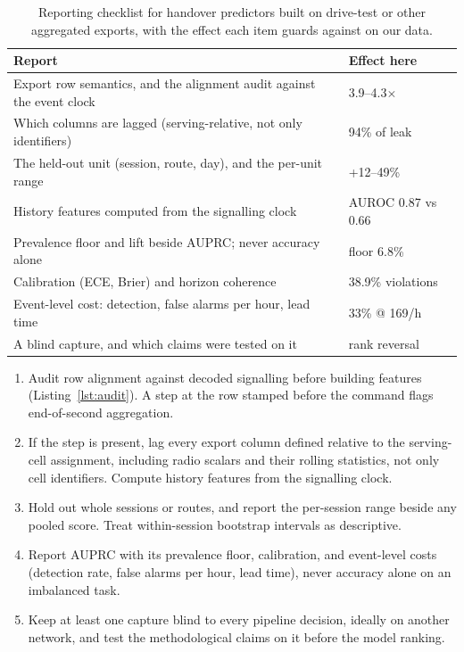 \documentclass[5p,times,twocolumn]{elsarticle}
\newcommand{\x}{$\times$}
\begin{document}
\begin{table}[t]
\centering
\caption{Reporting checklist for handover predictors built on drive-test or other aggregated exports, with the effect each item guards against on our data.}
\label{tab:checklist}
\footnotesize
\begin{tabularx}{\linewidth}{X l}
\toprule
\textbf{Report} & \textbf{Effect here} \\
\midrule
Export row semantics, and the alignment audit against the event clock & 3.9--4.3\x \\
Which columns are lagged (serving-relative, not only identifiers) & 94\% of leak \\
The held-out unit (session, route, day), and the per-unit range & +12--49\% \\
History features computed from the signalling clock & AUROC 0.87 vs 0.66 \\
Prevalence floor and lift beside AUPRC; never accuracy alone & floor 6.8\% \\
Calibration (ECE, Brier) and horizon coherence & 38.9\% violations \\
Event-level cost: detection, false alarms per hour, lead time & 33\% @ 169/h \\
A blind capture, and which claims were tested on it & rank reversal \\
\bottomrule
\end{tabularx}
\end{table}

\begin{enumerate}
\item Audit row alignment against decoded signalling before building features (Listing~\ref{lst:audit}). A step at the row stamped before the command flags end-of-second aggregation.
\item If the step is present, lag every export column defined relative to the serving-cell assignment, including radio scalars and their rolling statistics, not only cell identifiers. Compute history features from the signalling clock.
\item Hold out whole sessions or routes, and report the per-session range beside any pooled score. Treat within-session bootstrap intervals as descriptive.
\item Report AUPRC with its prevalence floor, calibration, and event-level costs (detection rate, false alarms per hour, lead time), never accuracy alone on an imbalanced task.
\item Keep at least one capture blind to every pipeline decision, ideally on another network, and test the methodological claims on it before the model ranking.
\end{enumerate}
\end{document}
